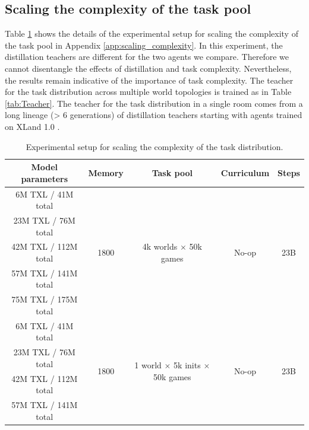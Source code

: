 \documentclass[11pt, a4paper, logo, copyright]{deepmind}
\begin{document}
\begin{appendix}
\subsection{Scaling the complexity of the task pool}
\label{app:task-complexity-scaling}
Table \ref{tab:task_complexity_scaling} shows the details of the experimental setup for scaling the complexity of the task pool in Appendix \ref{app:scaling_complexity}. In this experiment, the distillation teachers are different for the two agents we compare. Therefore we cannot disentangle the effects of distillation and task complexity. Nevertheless, the results remain indicative of the importance of task complexity. The teacher for the task distribution across multiple world topologies is trained as in Table \ref{tab:Teacher}. The teacher for the task distribution in a single room comes from a long lineage (> 6 generations) of distillation teachers starting with agents trained on XLand 1.0 \citep{xland}.
\begin{table}[h!]
  \begin{center}
    \caption{Experimental setup for scaling the complexity of the task distribution.}
    \begin{tabular}{c|c|c|c|c}
    \label{tab:task_complexity_scaling}
      Model parameters & Memory & Task pool & Curriculum  & Steps \\
      \hline
      6M TXL / 41M total & \multirow{5}{*}{1800} & \multirow{5}{*}{4k worlds $\times$ 50k games} & \multirow{5}{*}{No-op} & \multirow{5}{*}{23B}\\
      23M TXL / 76M total&&&&\\
      42M TXL / 112M total&&&&\\
      57M TXL / 141M total&&&&\\
      75M TXL / 175M total&&&&\\
      \hline
      6M TXL / 41M total &  \multirow{4}{*}{1800} & \multirow{4}{*}{1 world $\times$ 5k inits $\times$ 50k games} & \multirow{4}{*}{No-op}&\multirow{4}{*}{23B}\\
      23M TXL / 76M total&&&&\\
      42M TXL / 112M total&&&&\\
      57M TXL / 141M total&&&&\\
    \end{tabular}
  \end{center}
\end{table}

\end{appendix}
\end{document}
